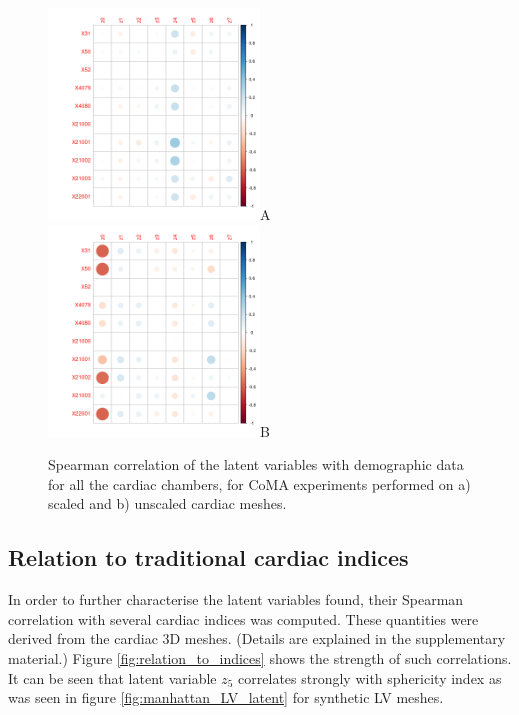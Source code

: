 \begin{figure}[ht!]
\includegraphics[width=0.5\textwidth]{figs/correlation/experiment_1_vs_demographic_data}A
\includegraphics[width=0.5\textwidth]{figs/correlation/experiment_2_vs_demographic_data}B
\label{fig:relation_to_demographic}
\caption{Spearman correlation of the latent variables with demographic data for all the cardiac chambers, for CoMA experiments performed on a) scaled and b) unscaled cardiac meshes.}
\end{figure}

\subsection*{Relation to traditional cardiac indices}
In order to further characterise the latent variables found, their Spearman correlation with several cardiac indices was computed. These quantities were derived from the cardiac 3D meshes. (Details are explained in the supplementary material.) 
Figure \ref{fig:relation_to_indices} shows the strength of such correlations.
It can be seen that latent variable $z_5$ correlates strongly with sphericity index as was seen in figure \ref{fig:manhattan_LV_latent} for synthetic LV meshes.

